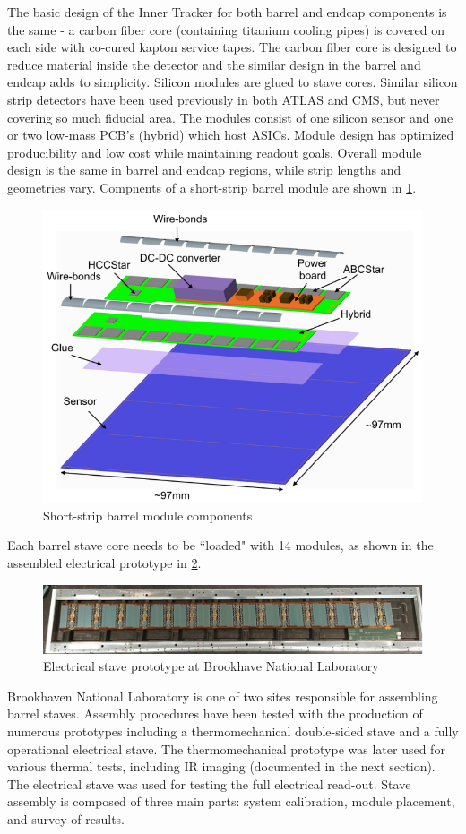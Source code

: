 The basic design of the Inner Tracker for both barrel and endcap components is the same - a carbon fiber core (containing titanium cooling pipes) is covered on each side with co-cured kapton service tapes. The carbon fiber core is designed to reduce material inside the detector and the similar design in the barrel and endcap adds to simplicity. Silicon modules are glued to stave cores. Similar silicon strip detectors have been used previously in both ATLAS and CMS, but never covering so much fiducial area. The modules consist of one silicon sensor and one or two low-mass PCB's (hybrid) which host ASICs. Module design has optimized producibility and low cost while maintaining readout goals. Overall module design is the same in barrel and endcap regions, while strip lengths and geometries vary. Compnents of a short-strip barrel module are shown in \ref{fig:module}.
\begin{figure}[!h]
        \centering
    \includegraphics[width=.4\textwidth]{Pictures/ITkmodule.png}
    \caption{Short-strip barrel module components \cite{ITktech}}
    \label{fig:module}
\end{figure}
 
Each barrel stave core needs to be ``loaded" with 14 modules, as shown in the assembled electrical prototype in \ref{fig:stave}. 

\begin{figure}[!h]
        \centering
    \includegraphics[width=.8\textwidth]{Pictures/electricalstave.png}
    \caption{Electrical stave prototype at Brookhave National Laboratory}
    \label{fig:stave}
\end{figure}

Brookhaven National Laboratory is one of two sites responsible for assembling barrel staves. Assembly procedures have been tested with the production of numerous prototypes including a thermomechanical double-sided stave and a fully operational electrical stave. The thermomechanical prototype was later used for various thermal tests, including IR imaging (documented in the next section). The electrical stave was used for testing the full electrical read-out. Stave assembly is composed of three main parts: system calibration, module placement, and survey of results. 

